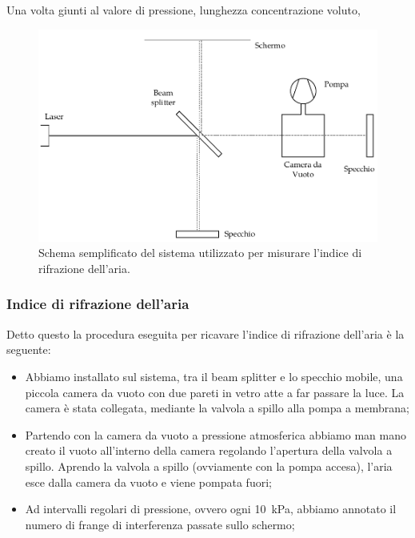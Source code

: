 Una volta giunti al valore di pressione, lunghezza concentrazione voluto,


\begin{figure}
    \centering
    \includegraphics[width=120mm]{drawing.pdf}
    \caption{Schema semplificato del sistema utilizzato per misurare l'indice di rifrazione dell'aria.}
    \label{fig:mik}
\end{figure}

\subsubsection{Indice di rifrazione dell'aria}

Detto questo la procedura eseguita per ricavare l'indice di rifrazione dell'aria è la seguente:

\begin{itemize}
	\item{Abbiamo installato sul sistema, tra il beam splitter e lo specchio mobile, una piccola camera da vuoto con due pareti in vetro atte a far passare la luce. La camera è stata collegata, mediante la valvola a spillo alla pompa a membrana;} %
    \item{Partendo con la camera da vuoto a pressione atmosferica abbiamo man mano creato il vuoto all'interno della camera regolando l'apertura della valvola a spillo. Aprendo la valvola a spillo (ovviamente con la pompa accesa), l'aria esce dalla camera da vuoto e viene pompata fuori;}
    \item{Ad intervalli regolari di pressione, ovvero ogni \SI{10}{\kilo\pascal}, abbiamo annotato il numero di frange di interferenza passate sullo schermo;}
\end{itemize}

